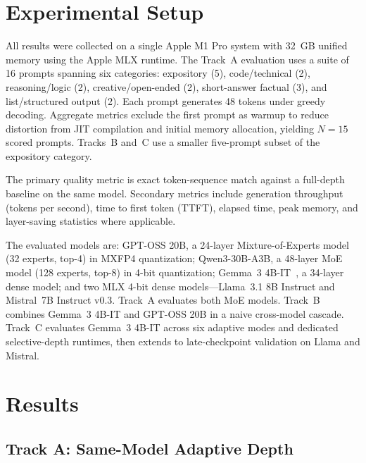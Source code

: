\documentclass[11pt]{article}
\begin{document}
\section{Experimental Setup}

All results were collected on a single Apple M1 Pro system with 32~GB unified memory using the Apple MLX runtime. The Track~A evaluation uses a suite of 16 prompts spanning six categories: expository (5), code/technical (2), reasoning/logic (2), creative/open-ended (2), short-answer factual (3), and list/structured output (2). Each prompt generates 48 tokens under greedy decoding. Aggregate metrics exclude the first prompt as warmup to reduce distortion from JIT compilation and initial memory allocation, yielding $N{=}15$ scored prompts. Tracks~B and~C use a smaller five-prompt subset of the expository category.

The primary quality metric is exact token-sequence match against a full-depth baseline on the same model. Secondary metrics include generation throughput (tokens per second), time to first token (TTFT), elapsed time, peak memory, and layer-saving statistics where applicable.

The evaluated models are: GPT-OSS 20B, a 24-layer Mixture-of-Experts model (32 experts, top-4) in MXFP4 quantization; Qwen3-30B-A3B, a 48-layer MoE model (128 experts, top-8) in 4-bit quantization; Gemma~3 4B-IT~\cite{gemma2024report}, a 34-layer dense model; and two MLX 4-bit dense models---Llama~3.1 8B Instruct and Mistral~7B Instruct v0.3. Track~A evaluates both MoE models. Track~B combines Gemma~3 4B-IT and GPT-OSS 20B in a naive cross-model cascade. Track~C evaluates Gemma~3 4B-IT across six adaptive modes and dedicated selective-depth runtimes, then extends to late-checkpoint validation on Llama and Mistral.

\section{Results}

\subsection{Track A: Same-Model Adaptive Depth}
\end{document}
